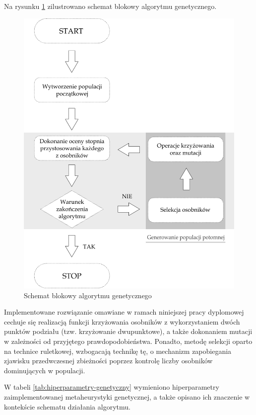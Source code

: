 Na rysunku \ref{fig:algorytm-genetyczny} zilustrowano schemat blokowy algorytmu genetycznego.

\begin{figure}[ht]
    \centering
     \includegraphics[width=0.6\linewidth]{rys04/algorytm-genetyczny.png}
    \caption{Schemat blokowy algorytmu genetycznego \cite{wozniak}}
    \label{fig:algorytm-genetyczny}
\end{figure}

Implementowane rozwiązanie omawiane w ramach niniejszej pracy dyplomowej cechuje się realizacją funkcji krzyżowania osobników z wykorzystaniem dwóch punktów podziału (tzw. krzyżowanie dwupunktowe), a także dokonaniem mutacji w zależności od przyjętego prawdopodobieństwa. Ponadto, metodę selekcji oparto na technice ruletkowej, wzbogacają technikę tę, o mechanizm zapobiegania zjawisku przedwczesnej zbieżności poprzez kontrolę liczby osobników dominujących w populacji.

W tabeli \ref{tab:hiperparametry-genetyczny} wymieniono hiperparametry zaimplementowanej metaheurystyki genetycznej, a także opisano ich znaczenie w kontekście schematu działania algorytmu.

